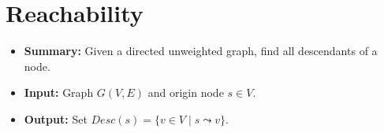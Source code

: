 \section{Reachability} \label{algorithm-reachability}
\begin{itemize}
    \item \textbf{Summary:} Given a directed unweighted graph, find all descendants of a node.
    \item \textbf{Input:} Graph $G(V,E)$ and origin node $s \in V$.
    \item \textbf{Output:} Set $Desc(s)=\{v \in V \mid s \leadsto v\}$.
\end{itemize}

